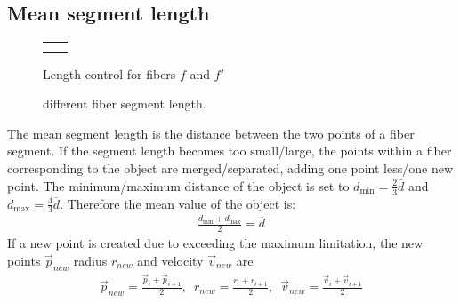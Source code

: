 \subsection{Mean segment length}
%
\begin{figure}[!t]
    \centering
    \tikzset{external/export=false}
    \def\forcetikzscale{true}
    \setlength{\tabcolsep}{0pt}
    \setlength{\tikzwidth}{.45\textwidth}
    \begin{tabular}{C{.5\textwidth}C{.5\textwidth}}
     &
     \\
     &
    \end{tabular}
	\caption{Length control for fibers $f$ and $f'$}
	\label{fig:mergeSplit}
\end{figure}
%
%
\begin{figure}[!t]
    \centering
    \setlength{\tikzwidth}{0.75\textwidth}
	\caption{different fiber segment length.}
	\label{fig:modelLength}
\end{figure}
%
The mean segment length is the distance between the two points of a fiber segment.
If the segment length becomes too small/large, the points within a fiber corresponding to the object are merged/separated, adding one point less/one new point.
The minimum/maximum distance of the object is set to $d_{\min} = \frac{2}{3} \overline{d}$ and $d_{\max} = \frac{4}{3}\overline{d}$.
Therefore the mean value of the object is:
\begin{align}
\frac{d_{\min} + d_{\max}}{2} = \overline{d}
\end{align}
%
If a new point is created due to exceeding the maximum limitation, the new points $\vec{p}_{new}$ radius $r_{new}$ and velocity $\vec{v}_{new}$ are
\begin{align}
\vec{p}_{new} = \frac{\vec{p}_{i} + \vec{p}_{i+1}}{2},\enspace
r_{new} = \frac{r_{i} + r_{i+1}}{2},\enspace
\vec{v}_{new} = \frac{\vec{v}_{i} + \vec{v}_{i+1}}{2}
\end{align}
%
